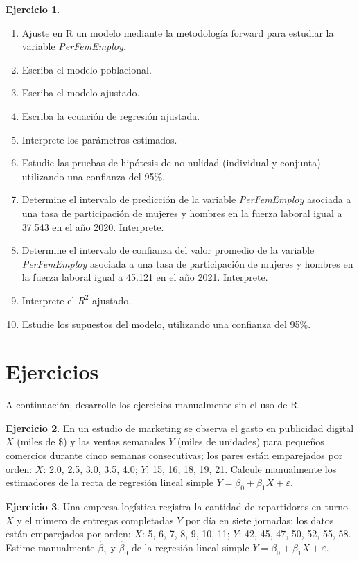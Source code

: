 \documentclass[
  11pt,
]{book}
\providecommand{\tightlist}{%
  \setlength{\itemsep}{0pt}\setlength{\parskip}{0pt}}
\theoremstyle{definition}
\theoremstyle{definition}
\theoremstyle{definition}
\newtheorem{exercise}{Ejercicio}[chapter]
\theoremstyle{definition}
\theoremstyle{remark}
\begin{document}
\begin{exercise}
\begin{enumerate}
\def\labelenumi{\arabic{enumi}.}
\tightlist
\item
  Ajuste en R un modelo mediante la metodología forward para estudiar la variable \emph{PerFemEmploy.}
\item
  Escriba el modelo poblacional.
\item
  Escriba el modelo ajustado.
\item
  Escriba la ecuación de regresión ajustada.
\item
  Interprete los parámetros estimados.
\item
  Estudie las pruebas de hipótesis de no nulidad (individual y conjunta) utilizando una confianza del 95\%.
\item
  Determine el intervalo de predicción de la variable \emph{PerFemEmploy} asociada a una tasa de participación de mujeres y hombres en la fuerza laboral igual a 37.543 en el año 2020. Interprete.
\item
  Determine el intervalo de confianza del valor promedio de la variable \emph{PerFemEmploy} asociada a una tasa de participación de mujeres y hombres en la fuerza laboral igual a 45.121 en el año 2021. Interprete.
\item
  Interprete el \(R^2\) ajustado.
\item
  Estudie los supuestos del modelo, utilizando una confianza del 95\%.
\end{enumerate}

\end{exercise}

\section{Ejercicios}\label{ejercicios-unidad-3}

A continuación, desarrolle los ejercicios manualmente sin el uso de R.

\begin{exercise}
En un estudio de marketing se observa el gasto en publicidad digital \(X\) (miles de \$) y las ventas semanales \(Y\) (miles de unidades) para pequeños comercios durante cinco semanas consecutivas; los pares están emparejados por orden: \(X\): 2.0, 2.5, 3.0, 3.5, 4.0; \(Y\): 15, 16, 18, 19, 21. Calcule manualmente los estimadores de la recta de regresión lineal simple \(Y=\beta_0+\beta_1 X+\varepsilon\).
\end{exercise}

\begin{exercise}
Una empresa logística registra la cantidad de repartidores en turno \(X\) y el número de entregas completadas \(Y\) por día en siete jornadas; los datos están emparejados por orden: \(X\): 5, 6, 7, 8, 9, 10, 11; \(Y\): 42, 45, 47, 50, 52, 55, 58. Estime manualmente \(\hat\beta_1\) y \(\hat\beta_0\) de la regresión lineal simple \(Y=\beta_0+\beta_1 X+\varepsilon\).
\end{exercise}
\end{document}

